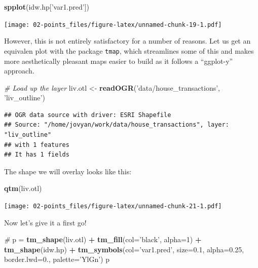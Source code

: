 \documentclass[]{book}
\newenvironment{Shaded}{\begin{snugshade}}{\end{snugshade}}
\newcommand{\CommentTok}[1]{\textcolor[rgb]{0.56,0.35,0.01}{\textit{#1}}}
\newcommand{\DataTypeTok}[1]{\textcolor[rgb]{0.13,0.29,0.53}{#1}}
\newcommand{\DecValTok}[1]{\textcolor[rgb]{0.00,0.00,0.81}{#1}}
\newcommand{\FloatTok}[1]{\textcolor[rgb]{0.00,0.00,0.81}{#1}}
\newcommand{\KeywordTok}[1]{\textcolor[rgb]{0.13,0.29,0.53}{\textbf{#1}}}
\newcommand{\NormalTok}[1]{#1}
\newcommand{\OperatorTok}[1]{\textcolor[rgb]{0.81,0.36,0.00}{\textbf{#1}}}
\newcommand{\StringTok}[1]{\textcolor[rgb]{0.31,0.60,0.02}{#1}}
\begin{document}
\begin{Shaded}
\begin{Highlighting}[]
\KeywordTok{spplot}\NormalTok{(idw.hp[}\StringTok{'var1.pred'}\NormalTok{])}
\end{Highlighting}
\end{Shaded}

\texttt{[image: 02-points\_files/figure-latex/unnamed-chunk-19-1.pdf]}

However, this is not entirely satisfactory for a number of reasons. Let us get an equivalen plot with the package \texttt{tmap}, which streamlines some of this and makes more aesthetically pleasant maps easier to build as it follows a ``ggplot-y'' approach.

\begin{Shaded}
\begin{Highlighting}[]
\CommentTok{# Load up the layer}
\NormalTok{liv.otl <-}\StringTok{ }\KeywordTok{readOGR}\NormalTok{(}\StringTok{'data/house_transactions'}\NormalTok{, }\StringTok{'liv_outline'}\NormalTok{)}
\end{Highlighting}
\end{Shaded}

\begin{verbatim}
## OGR data source with driver: ESRI Shapefile 
## Source: "/home/jovyan/work/data/house_transactions", layer: "liv_outline"
## with 1 features
## It has 1 fields
\end{verbatim}

The shape we will overlay looks like this:

\begin{Shaded}
\begin{Highlighting}[]
\KeywordTok{qtm}\NormalTok{(liv.otl)}
\end{Highlighting}
\end{Shaded}

\texttt{[image: 02-points\_files/figure-latex/unnamed-chunk-21-1.pdf]}

Now let's give it a first go!

\begin{Shaded}
\begin{Highlighting}[]
\CommentTok{# }
\NormalTok{p =}\StringTok{ }\KeywordTok{tm_shape}\NormalTok{(liv.otl) }\OperatorTok{+}\StringTok{ }\KeywordTok{tm_fill}\NormalTok{(}\DataTypeTok{col=}\StringTok{'black'}\NormalTok{, }\DataTypeTok{alpha=}\DecValTok{1}\NormalTok{) }\OperatorTok{+}
\StringTok{  }\KeywordTok{tm_shape}\NormalTok{(idw.hp) }\OperatorTok{+}\StringTok{ }
\StringTok{  }\KeywordTok{tm_symbols}\NormalTok{(}\DataTypeTok{col=}\StringTok{'var1.pred'}\NormalTok{, }\DataTypeTok{size=}\FloatTok{0.1}\NormalTok{, }\DataTypeTok{alpha=}\FloatTok{0.25}\NormalTok{, }
             \DataTypeTok{border.lwd=}\FloatTok{0.}\NormalTok{, }\DataTypeTok{palette=}\StringTok{'YlGn'}\NormalTok{)}
\NormalTok{p}
\end{Highlighting}
\end{Shaded}
\end{document}

